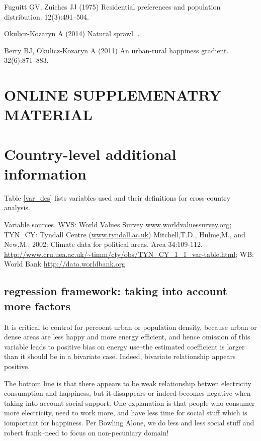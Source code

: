 \documentclass[10pt, letterpaper]{article}
\begin{document}
\begin{spacing}{1.4}
\begin{thebibliography}{10}
Fuguitt GV, Zuiches JJ (1975) Residential preferences and population
  distribution.
 12(3):491--504.

Okulicz-Kozaryn A (2014) Natural sprawl.
.

Berry BJ, Okulicz-Kozaryn A (2011) An urban-rural happiness gradient.
 32(6):871--883.

\end{thebibliography}




\newpage
\section{\huge ONLINE SUPPLEMENATRY MATERIAL}

\tableofcontents

\section{Country-level additional information}

Table
\ref{var_des} lists variables used and their definitions for cross-country
analysis. 



{\scriptsize \noindent Variable sources. WVS: World Values Survey \url{www.worldvaluessurvey.org};
TYN\_CY: Tyndall Centre (\url{www.tyndall.ac.uk}) Mitchell,T.D., Hulme,M., and
New,M., 2002: Climate data for political areas. Area
34:109-112. \url{http://www.cru.uea.ac.uk/~timm/cty/obs/TYN_CY_1_1_var-table.html};
WB: World Bank \url{http://data.worldbank.org}}



\subsection{regression framework: taking into account more factors} 

It is critical to control for percoent urban or population density, because
urban or dense areas are less happy and more energy efficient, and hence
omission of this variable leads to positive bias on energy use--the estimated
coefficient   is larger than it should be in a bivariate case. Indeed, bivariate
relationship appears positive. 

The bottom line is that there appears to be weak relationship betwen electricity
consumption and happiness, but it disappears or indeed becomes negative when
taking into account social support. One explanation is that people who consumer
more electricity, need to work more, and have less time for social stuff which
is iomportant for happiness. Per Bowling Alone, we do less and less social stuff
and robert frank--need to focus on non-pecuniary domain!


\end{spacing}
\end{document}
